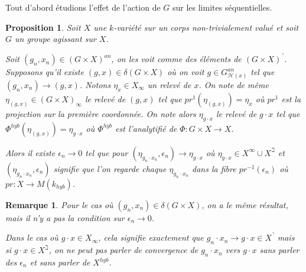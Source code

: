 \documentclass[11pt]{article}
\newtheorem{prop}[thm]{Proposition}
\newtheorem{rem}[thm]{Remarque}
\begin{document}
Tout d'abord étudions l'effet de l'action de $G$ sur les limites séquentielles.

\begin{prop}\label{g_n x_n tend vers g x}
Soit $X$ une $k$-variété sur un corps non-trivialement valué et soit $G$ un groupe agissant sur $X$.

Soit $(g_n, x_n) \in (G \times X)^{an}$, on les voit comme des éléments de $(G\times X)^\urcorner$. Supposons qu'il existe $(g, x)\in \delta (G \times X)$ où on voit $g \in G_{\mathcal{H}(x)}^{an}$ tel que  $(g_n, x_n) \rightarrow (g, x)$. Notons $\eta_x \in X_\infty$ un relevé de $x$. On note de même $\eta_{(g,x)} \in (G\times X)_\infty$ le relevé de $(g,x)$ tel que $pr^1(\eta_{(g,x)}) = \eta_x$ où $pr^1$ est la projection sur la première coordonnée. On note alors $\eta_{g\cdot x}$ le relevé de $g\cdot x$ tel que $\Phi^{hyb}(\eta_{(g,x)}) = \eta_{g\cdot x}$ où $\Phi^{hyb}$ est l'analytifié de $\Phi : G\times X \rightarrow X$.

Alors il existe $\epsilon_n \rightarrow 0$ tel que pour $(\eta_{g_n \cdot x_n},{\epsilon_n}) \rightarrow \eta_{g \cdot x}$ où $\eta_{g \cdot x} \in X^\infty \cup X^\beth$ et $(\eta_{g_n \cdot x_n},{\epsilon_n})$ signifie que l'on regarde chaque $\eta_{g_n \cdot x_n}$ dans la fibre $pr^{-1}(\epsilon_n)$ où $pr : X \rightarrow M(k_{hyb})$.
\end{prop}

\begin{rem}
Pour le cas où $(g_n, x_n) \in \delta (G \times X)$, on a le même résultat, mais il n'y a pas la condition sur $\epsilon_n \rightarrow 0$.

Dans le cas où $g\cdot x \in X_\infty$, cela signifie exactement que $g_n\cdot x_n \rightarrow g \cdot x \in X^\urcorner$ mais si $g\cdot x \in X^\beth$, on ne peut pas parler de convergence de $g_n\cdot x_n$ vers $g\cdot x$ sans parler des $\epsilon_n$ et sans parler de $X^{hyb}$.
\end{rem}
\end{document}
